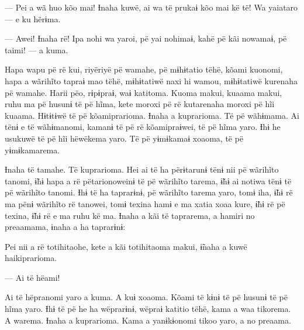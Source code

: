 --- Pei a wã huo kõo mai! Ɨnaha kuwë, ai wa të prukaɨ kõo mai kë të! Wa
yaiataro --- e ku hërɨma. 

--- Awei! Ɨnaha rë! Ipa nohi wa yaroi, pë yai nohimaɨ, kahë pë kãi
nowamaɨ, pë taimi! --- a kuma. 


Hapa wapu pë rë kui, riyëriyë pë wamahe, pë mɨhɨtatio tëhë, kõami
kuonomi, hapa a wãrihĩto tapraɨ mao tëhë, mɨhɨtatiwë naxi hi wamou,
mɨhɨtatiwë kurenaha pë wamahe. Harii pëo, rɨpɨpraɨ, waɨ katitoma. Kuoma
makui, kuaama makui, ruhu ma pë husunɨ të pë hĩma, kete moroxi pë rë
kutarenaha moroxi pë hĩi kuaama. Hɨtɨtɨwë të pë kõamiprarioma. Ɨnaha a
kuprarioma. Të pë wãhɨmama. Ai tënɨ e të wãhɨmanomi, kamanɨ të pë rë
kõamipraɨwei, të pë hĩma yaro. Ɨhɨ he usukuwë të pë hĩi hëwëkema yaro.
Të pë yɨmɨkamaɨ xoaoma, të pë yɨmɨkamarema. 


Ɨnaha të tamahe. Të kuprarioma. Hei ai të ha përɨtarunɨ tënɨ nii pë
wãrihĩto tanomi, ɨ̃hɨ hapa a rë pëtarionoweinɨ të pë wãrihĩto tarema, ɨ̃hɨ
ai notiwa tënɨ të pë wãrihĩto tanomi. Ɨhɨ të ha taprarɨnɨ, pë wãrihĩto
tarema yaro, tomɨ iha, ɨ̃hɨ rë ma pënɨ wãrihĩto rë tanowei, tomɨ texina
hamɨ e ma xatia xoaa kure, ɨ̃hɨ rë pë texina, ɨ̃hɨ rë e ma ruhu kë ma.
Ɨnaha a kãi të taprarema, a hamiri no preaamama, ɨnaha a ha taprarɨnɨ:

Pei nii a rë totihitaohe, kete a kãi totihitaoma makui, ɨ̃naha a kuwë
haikiprarioma. 

--- Ai të hëami! 

Ai të hëpranomi yaro a kuma. A kuɨ xoaoma. Kõami të kɨnɨ të pë husunɨ të
pë hĩma yaro. Ɨhɨ të pë he ha wëprarɨnɨ, wëpraɨ katitio tëhë, kama a waa
tikorema. A warema. Ɨnaha a kuprarioma. Kama a yanɨkɨonomi tikoo yaro, a
no preaama.

